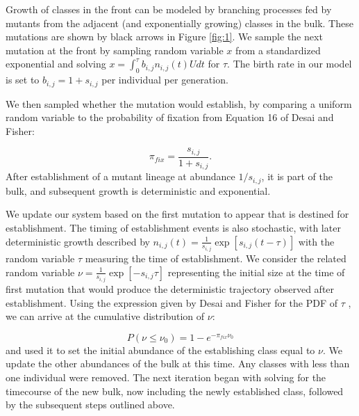 \documentclass[9pt,twocolumn,twoside]{gsajnl}
\begin{document}
Growth of classes in the front can be modeled by branching processes fed by mutants from the adjacent (and exponentially growing) classes in the bulk. These mutations are shown by black arrows in Figure \ref{fig:1}. We sample the next mutation at the front by sampling random variable $x$ from a standardized exponential and solving $ x=\int_0^{\tau} b_{i,j} n_{i,j}(t)U dt$ for $\tau$. The birth rate in our model is set to $b_{i,j}=1+s_{i,j}$ per individual per generation.    

We then sampled whether the mutation would establish, by comparing a uniform random variable to the probability of fixation from Equation 16 of Desai and Fisher:

\begin{equation} \label{eq:3}
\pi_{fix} = \frac{s_{i,j}}{ 1+s_{i,j}}.
\end{equation}
After establishment of a mutant lineage at abundance $1/s_{i,j}$, it is part of the bulk, and subsequent growth is deterministic and exponential. \par

We update our system based on the first mutation to appear that is destined for establishment. The timing of establishment events is also stochastic, with later deterministic growth described by $n_{i,j}(t) = \frac{1}{s_{i,j}} \exp[{s_{i,j}(t-\tau)}]$ with the random variable $\tau$ measuring the time of establishment. We consider the related random variable $\nu = \frac{1}{s_{i,j}}\exp[-s_{i,j}\tau]$ representing the initial size at the time of first mutation that would produce the deterministic trajectory observed after establishment. Using the expression given by Desai and Fisher for the PDF of $\tau$ \citep[Equation 12]{desai2007beneficial}, we can arrive at the cumulative distribution of $\nu$:
% 
% 
% 
% 

\begin{equation} \label{eq:4}
P(\nu \leq \nu_0) = 1- e^{-\pi_{fix} \nu_0}
\end{equation}and used it to set the initial abundance of  the establishing class equal to $\nu$. We update the other abundances of the bulk at this time. Any classes with less than one individual were removed. The next iteration began with solving for the timecourse of the new bulk, now including the newly established class, followed by the subsequent steps outlined above.\par
\end{document}
